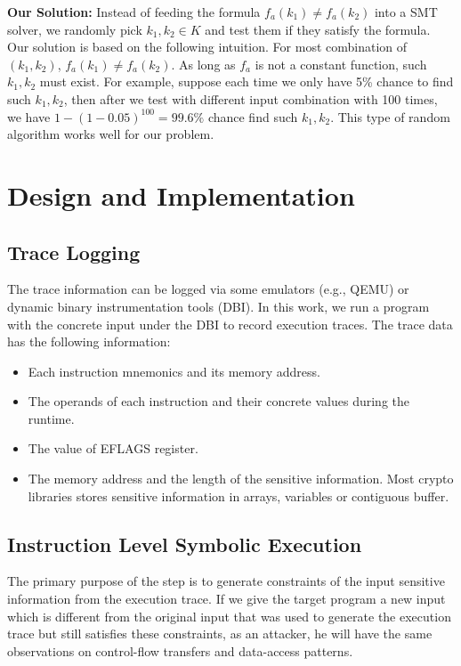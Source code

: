 \textbf{Our Solution:}
Instead of feeding the formula $f_a(k_1) \neq f_a(k_2)$ into a SMT solver, we
randomly pick $k_1, k_2 \in K$ and test them if they satisfy the
formula. Our solution is based on the following intuition. For most combination
of $(k_{1}, k_{2} )$, $f_a(k_1) \neq f_a(k_2)$. As long as
$f_a$ is not a constant function, such $k_1, k_2$ must exist. For example,
suppose each time we only have 5\% chance to find such $k_1, k_2$, then after we
test with different input combination with 100 times, we have $1 -
  (1-0.05)^{100} = 99.6\%$ chance find such $k_1, k_2$. This type of random algorithm works well for our problem.

\section{Design and Implementation}
\subsection{Trace Logging}
The trace information can be logged via some emulators (e.g., QEMU) or dynamic binary instrumentation tools (DBI).
In this work, we run a program with the concrete input under the DBI to record execution traces.
The trace data has the following information:
\begin{itemize}
  \item Each instruction mnemonics and its memory address.
  \item The operands of each instruction and their concrete values during the runtime.
  \item The value of EFLAGS register.
  \item The memory address and the length of the sensitive information.
        Most crypto libraries stores sensitive information in arrays,
        variables or contiguous buffer.
\end{itemize}

\subsection{Instruction Level Symbolic Execution}
\label{InstructionSE}
The primary purpose of the step is to generate constraints of the input sensitive information from the execution trace. If we give the target program a new input which is different from the original input that was used to generate the execution trace but still satisfies these constraints, as an attacker, he will have the same observations on control-flow transfers and data-access patterns.

